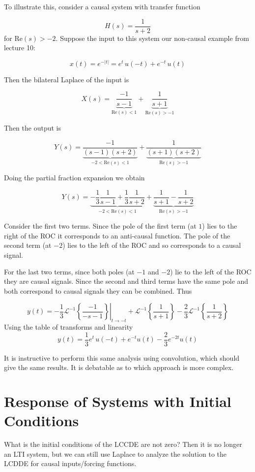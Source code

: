 \documentclass{article}
\begin{document}
To illustrate this, consider a causal system with transfer function

$$
H(s) = \frac{1}{s+2}
$$
for $\text{Re}(s) > -2$. Suppose the input to this system our non-causal example from lecture 10:

$$
x(t) = e^{-|t|} = e^t\, u(-t) + e^{-t}\, u(t)
$$

Then the bilateral Laplace of the input is

$$
X(s) = \underbrace{\frac{-1}{s-1}}_{\text{Re}(s) < 1} + \underbrace{\frac{1}{s+1}}_{\text{Re}(s) > -1} 
$$

Then the output is

$$
Y(s) = \underbrace{\frac{-1}{(s-1)(s+2)}}_{-2 <\text{Re}(s) < 1} + \underbrace{\frac{1}{(s+1)(s+2)}}_{\text{Re}(s) > -1}
$$

Doing the partial fraction expansion we obtain

$$
Y(s) = \underbrace{-\frac{1}{3}\frac{1}{s-1} + \frac{1}{3}\frac{1}{s+2}}_{-2 <\text{Re}(s) < 1} + \underbrace{\frac{1}{s+1} - \frac{1}{s+2}}_{\text{Re}(s) > -1}
$$

Consider the first two terms. Since the pole of the first term (at $1$) lies to the right of the ROC it corresponds to an anti-causal function. The pole of the second term (at $-2$) lies to the left of the ROC and so corresponds to a causal signal.

For the last two terms, since both poles (at $-1$ and $-2$) lie to the left of the ROC they are causal signals. Since the second and third terms have the same pole and both correspond to causal signals they can be combined. Thus

$$
y(t) = -\frac{1}{3} \left. \mathcal{L}^{-1}\left\{ \frac{-1}{-s-1}\right\} \right|_{t\rightarrow -t} + \mathcal{L}^{-1}\left\{ \frac{1}{s+1}\right\} -\frac{2}{3} \mathcal{L}^{-1}\left\{ \frac{1}{s+2}\right\} 
$$
Using the table of transforms and linearity
$$
y(t) = \frac{1}{3}e^t\, u(-t) + e^{-t}u(t) - \frac{2}{3} e^{-2t}u(t)
$$

It is instructive to perform this same analysis using convolution, which should give the same results. It is debatable as to which approach is more complex.

\section{Response of Systems with Initial Conditions}

What is the initial conditions of the LCCDE are not zero? Then it is no longer an LTI system, but we can still use Laplace to analyze the solution to the LCDDE for causal inputs/forcing functions.
\end{document}
